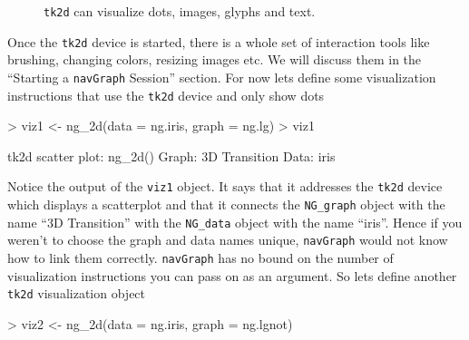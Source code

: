\documentclass[12pt,oneside,titlepage,letter]{article}
\begin{document}
\begin{figure}[h]
\begin{center}
\end{center}
  \caption{\texttt{tk2d} can visualize dots, images, glyphs and text.}
  \label{fig:tk2d}
\end{figure}

Once the \texttt{tk2d} device is started, there is a whole set of interaction tools like brushing, changing colors, resizing images etc. We will discuss them in the ``Starting a \texttt{navGraph} Session'' section. For now lets define some visualization instructions that use the \texttt{tk2d} device and only show dots

\begin{Schunk}
\begin{Sinput}
> viz1 <- ng_2d(data = ng.iris, graph = ng.lg)
> viz1
\end{Sinput}
\begin{Soutput}
tk2d scatter plot: ng_2d()
Graph: 3D Transition 
Data: iris 
\end{Soutput}
\end{Schunk}
Notice the output of the \texttt{viz1} object. It says that it addresses the \texttt{tk2d} device which displays a scatterplot and that it connects the \texttt{NG\_graph} object with the name ``3D Transition'' with the \texttt{NG\_data} object with the name ``iris''. Hence if you weren't to choose the graph and data names unique, \texttt{navGraph} would not know how to link them correctly. \texttt{navGraph} has no bound on the number of visualization instructions you can pass on as an argument. So lets define another \texttt{tk2d} visualization object
\begin{Schunk}
\begin{Sinput}
> viz2 <- ng_2d(data = ng.iris, graph = ng.lgnot)
\end{Sinput}
\end{Schunk}
\end{document}
